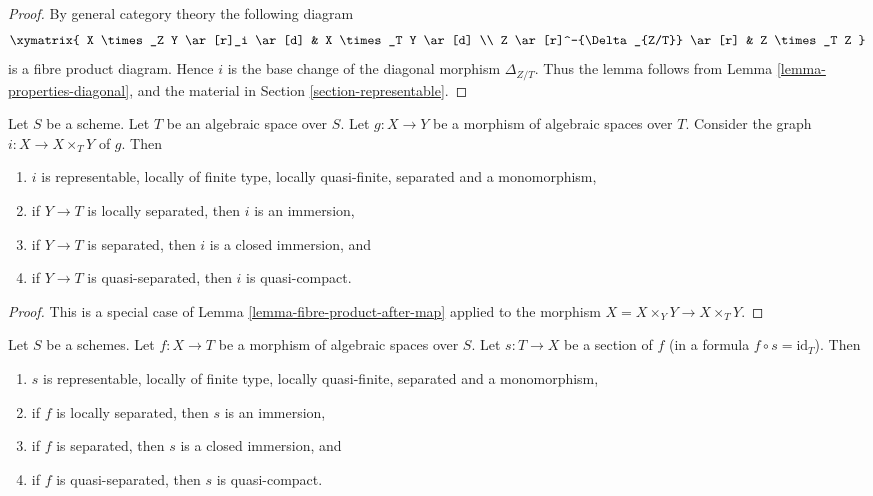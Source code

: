 \begin{proof}
By general category theory the following diagram
$$
\xymatrix{
X \times_Z Y \ar[r]_i \ar[d] & X \times_T Y \ar[d] \\
Z \ar[r]^-{\Delta_{Z/T}} \ar[r] & Z \times_T Z
}
$$
is a fibre product diagram. Hence $i$ is the base change of the
diagonal morphism $\Delta_{Z/T}$. Thus the lemma follows
from Lemma \ref{lemma-properties-diagonal}, and the material in
Section \ref{section-representable}.
\end{proof}

\begin{lemma}
\label{lemma-semi-diagonal}
Let $S$ be a scheme. Let $T$ be an algebraic space over $S$.
Let $g : X \to Y$ be a morphism of algebraic spaces over $T$.
Consider the graph $i : X \to X \times_T Y$ of $g$. Then
\begin{enumerate}
\item $i$ is representable, locally of finite type, locally quasi-finite,
separated and a monomorphism,
\item if $Y \to T$ is locally separated, then $i$ is an immersion,
\item if $Y \to T$ is separated, then $i$ is a closed immersion, and
\item if $Y \to T$ is quasi-separated, then $i$ is quasi-compact.
\end{enumerate}
\end{lemma}

\begin{proof}
This is a special case of Lemma \ref{lemma-fibre-product-after-map}
applied to the morphism $X = X \times_Y Y \to X \times_T Y$.
\end{proof}

\begin{lemma}
\label{lemma-section-immersion}
Let $S$ be a schemes.
Let $f : X \to T$ be a morphism of algebraic spaces over $S$.
Let $s : T \to X$ be a section of $f$ (in a formula
$f \circ s = \text{id}_T$). Then
\begin{enumerate}
\item $s$ is representable, locally of finite type, locally quasi-finite,
separated and a monomorphism,
\item if $f$ is locally separated, then $s$ is an immersion,
\item if $f$ is separated, then $s$ is a closed immersion, and
\item if $f$ is quasi-separated, then $s$ is quasi-compact.
\end{enumerate}
\end{lemma}

